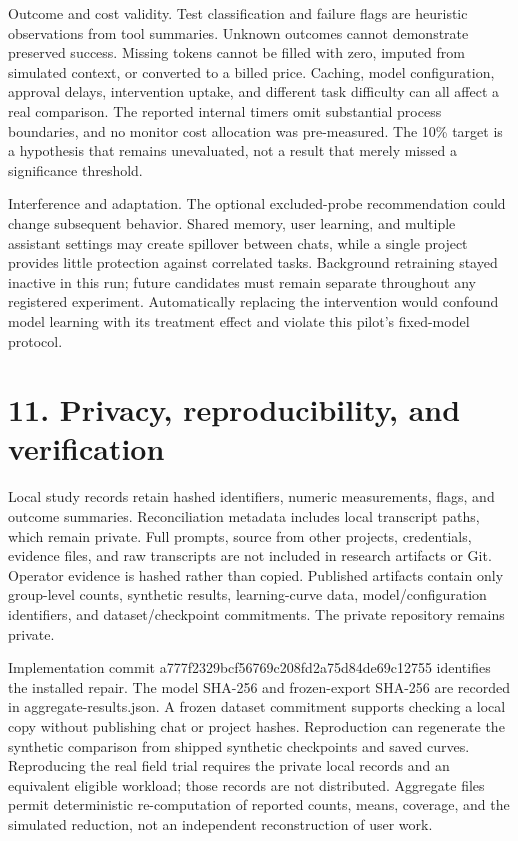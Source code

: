 \documentclass[11pt]{article}
\begin{document}
Outcome and cost validity. Test classification and failure flags are heuristic observations from tool summaries. Unknown outcomes cannot demonstrate preserved success. Missing tokens cannot be filled with zero, imputed from simulated context, or converted to a billed price. Caching, model configuration, approval delays, intervention uptake, and different task difficulty can all affect a real comparison. The reported internal timers omit substantial process boundaries, and no monitor cost allocation was pre-measured. The 10\% target is a hypothesis that remains unevaluated, not a result that merely missed a significance threshold.

Interference and adaptation. The optional excluded-probe recommendation could change subsequent behavior. Shared memory, user learning, and multiple assistant settings may create spillover between chats, while a single project provides little protection against correlated tasks. Background retraining stayed inactive in this run; future candidates must remain separate throughout any registered experiment. Automatically replacing the intervention would confound model learning with its treatment effect and violate this pilot's fixed-model protocol.

\section*{11. Privacy, reproducibility, and verification}
Local study records retain hashed identifiers, numeric measurements, flags, and outcome summaries. Reconciliation metadata includes local transcript paths, which remain private. Full prompts, source from other projects, credentials, evidence files, and raw transcripts are not included in research artifacts or Git. Operator evidence is hashed rather than copied. Published artifacts contain only group-level counts, synthetic results, learning-curve data, model/configuration identifiers, and dataset/checkpoint commitments. The private repository remains private.

Implementation commit a777f2329bcf56769c208fd2a75d84de69c12755 identifies the installed repair. The model SHA-256 and frozen-export SHA-256 are recorded in aggregate-results.json. A frozen dataset commitment supports checking a local copy without publishing chat or project hashes. Reproduction can regenerate the synthetic comparison from shipped synthetic checkpoints and saved curves. Reproducing the real field trial requires the private local records and an equivalent eligible workload; those records are not distributed. Aggregate files permit deterministic re-computation of reported counts, means, coverage, and the simulated reduction, not an independent reconstruction of user work.
\end{document}
